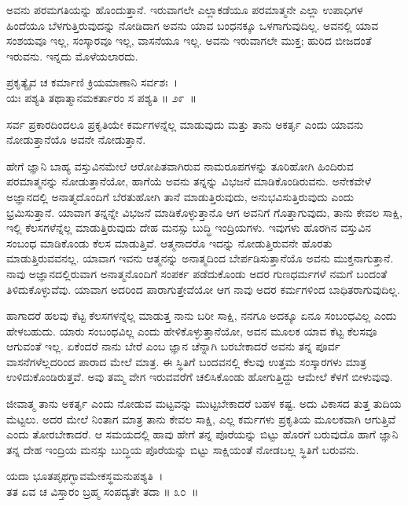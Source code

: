 ಅವನು ಪರಮಗತಿಯನ್ನು ಹೊಂದುತ್ತಾನೆ. ಇರುವಾಗಲೇ ಎಲ್ಲಾಕಡೆಯೂ ಪರಮಾತ್ಮನೇ ಎಲ್ಲಾ ಉಪಾಧಿಗಳ ಹಿಂದೆಯೂ ಬೆಳಗುತ್ತಿರುವುದನ್ನು ನೋಡಿದಾಗ ಅವನು ಯಾವ ಬಂಧನಕ್ಕೂ ಒಳಗಾಗುವುದಿಲ್ಲ. ಅವನಲ್ಲಿ ಯಾವ ಸಂಶಯವೂ ಇಲ್ಲ, ಸಂಸ್ಕಾರವೂ ಇಲ್ಲ, ವಾಸನೆಯೂ ಇಲ್ಲ. ಅವನು ಇರುವಾಗಲೇ ಮುಕ್ತ; ಹುರಿದ ಬೀಜದಂತೆ ಇರುವನು. ಇನ್ನದು ಮೊಳೆಯಲಾರದು.

\begin{shloka}
ಪ್ರಕೃತ್ಯೈವ ಚ ಕರ್ಮಾಣಿ ಕ್ರಿಯಮಾಣಾನಿ ಸರ್ವಶಃ~।\\ಯಃ ಪಶ್ಯತಿ ತಥಾತ್ಮಾನಮಕರ್ತಾರಂ ಸ ಪಶ್ಯತಿ \hfill॥ ೨೯~॥
\end{shloka}

\begin{artha}
ಸರ್ವ ಪ್ರಕಾರದಿಂದಲೂ ಪ್ರಕೃತಿಯೇ ಕರ್ಮಗಳನ್ನೆಲ್ಲ ಮಾಡುವುದು ಮತ್ತು ತಾನು ಅಕರ್ತೃ ಎಂದು ಯಾವನು ನೋಡುತ್ತಾನೆಯೊ ಅವನೇ ನೋಡುತ್ತಾನೆ.
\end{artha}

ಹೇಗೆ ಜ್ಞಾನಿ ಬಾಹ್ಯ ವಸ್ತುವಿನಮೇಲೆ ಆರೋಪಿತವಾಗಿರುವ ನಾಮರೂಪಗಳನ್ನು ತೂರಿಹೋಗಿ ಹಿಂದಿರುವ ಪರಮಾತ್ಮನನ್ನು ನೋಡುತ್ತಾನೆಯೋ, ಹಾಗೆಯೆ ಅವನು ತನ್ನನ್ನು ವಿಭಜನೆ ಮಾಡಿ\-ಕೊಂಡಿರುವನು. ಅನೇಕವೇಳೆ ಅಜ್ಞಾನದಲ್ಲಿ ಅನಾತ್ಮದೊಂದಿಗೆ ಬೆರತುಹೋಗಿ ತಾನೆ ಮಾಡುತ್ತಿರುವುದು, ಅನುಭವಿಸುತ್ತಿರುವುದು ಎಂದು ಭ್ರಮಿಸುತ್ತಾನೆ. ಯಾವಾಗ ತನ್ನನ್ನೇ ವಿಭಜನೆ ಮಾಡಿ\-ಕೊಳ್ಳುತ್ತಾನೊ ಆಗ ಅವನಿಗೆ ಗೊತ್ತಾಗುವುದು, ತಾನು ಕೇವಲ ಸಾಕ್ಷಿ, ಇಲ್ಲಿ ಕೆಲಸಗಳೆನ್ನೆಲ್ಲ ಮಾಡುತ್ತಿರುವುದು ದೇಹ ಮನಸ್ಸು ಬುದ್ಧಿ ಇಂದ್ರಿಯಗಳು. ಇವುಗಳು ಹೊರಗಿನ ವಸ್ತುವಿನ ಸಂಬಂಧ ಮಾಡಿಕೊಂಡು ಕೆಲಸ ಮಾಡುತ್ತಿವೆ. ಆತ್ಮನಾದರೊ ಇದನ್ನು ನೋಡುತ್ತಿರುವನೇ ಹೊರತು ಮಾಡುತ್ತಿರುವವನಲ್ಲ. ಯಾವಾಗ ಇವನು ಆತ್ಮನನ್ನು ಅನಾತ್ಮದಿಂದ ಬೇರ್ಪಡಿಸು\-ತ್ತಾನೆಯೊ ಅವನು ಮುಕ್ತನಾಗುತ್ತಾನೆ. ನಾವು ಅಜ್ಞಾನದಲ್ಲಿರುವಾಗ ಅನಾತ್ಮನೊಂದಿಗೆ ಸಂಪರ್ಕ ಪಡೆದುಕೊಂಡು ಅದರ ಗುಣಧರ್ಮಗಳೆ ನಮಗೆ ಬಂದಂತೆ ತಿಳಿದುಕೊಳ್ಳುವೆವು. ಯಾವಾಗ ಅದರಿಂದ ಪಾರಾಗುತ್ತೇವೆಯೋ ಆಗ ನಾವು ಅದರ ಕರ್ಮಗಳಿಂದ ಬಾಧಿತರಾಗುವುದಿಲ್ಲ.

ಹಾಗಾದರೆ ಹಲವು ಕೆಟ್ಟ ಕೆಲಸಗಳನ್ನೆಲ್ಲ ಮಾಡುತ್ತ ನಾನು ಬರೀ ಸಾಕ್ಷಿ, ನನಗೂ ಅದಕ್ಕೂ ಏನೂ ಸಂಬಂಧವಿಲ್ಲ ಎಂದು ಹೇಳಬಹುದು. ಯಾರು ಸಂಬಂಧವಿಲ್ಲ ಎಂದು ಹೇಳಿಕೊಳ್ಳುತ್ತಾನೆಯೋ, ಅವನ ಮೂಲಕ ಯಾವ ಕೆಟ್ಟ ಕೆಲಸವೂ ಆಗುವಂತೆ ಇಲ್ಲ. ಏಕೆಂದರೆ ನಾನು ಬೇರೆ ಎಂಬ ಜ್ಞಾನ ಚೆನ್ನಾಗಿ ಬರಬೇಕಾದರೆ ಅವನು ತನ್ನ ಪೂರ್ವ ವಾಸನೆಗಳೆಲ್ಲದರಿಂದ ಪಾರಾದ ಮೇಲೆ ಮಾತ್ರ. ಈ ಸ್ಥಿತಿಗೆ ಬಂದವನಲ್ಲಿ ಕೆಲವು ಉತ್ತಮ ಸಂಸ್ಕಾರಗಳು ಮಾತ್ರ ಉಳಿದುಕೊಂಡಿರುತ್ತವೆ. ಅವು ತಮ್ಮ ವೇಗ ಇರುವವರೆಗೆ ಚಲಿಸಿಕೊಂಡು ಹೋಗುತ್ತಿದ್ದು ಆಮೇಲೆ ಕೆಳಗೆ ಬೀಳುವುವು.

ಜೀವಾತ್ಮ ತಾನು ಅಕರ್ತೃ ಎಂದು ನೋಡುವ ಮಟ್ಟವನ್ನು ಮುಟ್ಟಬೇಕಾದರೆ ಬಹಳ ಕಷ್ಟ. ಅದು ವಿಕಾಸದ ತುತ್ತ ತುದಿಯ ಮೆಟ್ಟಲು. ಅದರ ಮೇಲೆ ನಿಂತಾಗ ಮಾತ್ರ ತಾನು ಕೇವಲ ಸಾಕ್ಷಿ, ಎಲ್ಲ ಕರ್ಮಗಳು ಪ್ರಕೃತಿಯ ಮೂಲಕವಾಗಿ ಆಗುತ್ತಿವೆ ಎಂದು ತೋರಬೇಕಾದರೆ. ಆ ಸಮಯದಲ್ಲಿ ಹಾವು ಹೇಗೆ ತನ್ನ ಪೊರೆಯನ್ನು ಬಿಟ್ಟು ಹೊರಗೆ ಬರುವುದೊ ಹಾಗೆ ಜ್ಞಾನಿ ತನ್ನ ದೇಹ ಇಂದ್ರಿಯ ಮನಸ್ಸು ಬುದ್ಧಿಯ ಪೊರೆಯನ್ನು ಬಿಟ್ಟು ಸಾಕ್ಷಿಯಂತೆ ನೋಡಬಲ್ಲ ಸ್ಥಿತಿಗೆ ಬರುವನು.

\begin{shloka}
ಯದಾ ಭೂತಪೃಥಗ್ಭಾವಮೇಕಸ್ಥಮನುಪಶ್ಯತಿ~।\\ತತ ಏವ ಚ ವಿಸ್ತಾರಂ ಬ್ರಹ್ಮ ಸಂಪದ್ಯತೇ ತದಾ \hfill॥ ೩೦~॥
\end{shloka}

